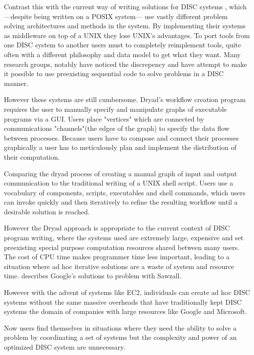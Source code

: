 \documentclass[11pt, letterpaper]{article}
\begin{document}
Contrast this with the current way of writing solutions for DISC systems , which ---despite being written on a POSIX system--- use vastly different problem solving architectures and methods in the system. By implementing their systems as middleware on top of a UNIX they lose UNIX's advantages.  To port tools from one DISC system to another users must to completely reimplement tools, quite often with a different philosophy and data model to get what they want. Many research groups, notably \cite{isard2007ddd} have noticed the discrepency and have attempt to make it possible to use preexisting sequential code to solve problems in a DISC manner.

However these systems are still cumbersome. Dryad's workflow creation program requires the user to manually specify and manipulate graphs of executable programs via a GUI. Users place "vertices" which are connected by communications "channels"(the edges of the graph) to specify the data flow between processes. Because users have to compose and connect their processes graphically a user has to meticulously plan and implement the distribution of their computation.

Comparing the dryad process of creating a manual graph of input and output communication to the traditional writing of a UNIX shell script. Users use a vocabulary of components, scripts, executables and shell commands, which users can invoke quickly and then iteratively to refine the resulting workflow until a desirable solution is reached.

However the Dryad approach is appropriate to the current context of DISC program writing, where the systems used are extremely large, expensive and set preexisting special purpose computation resources shared between many users. The cost of CPU time makes programmer time less important, leading to a situation where ad hoc iterative solutions are a waste of system and resource time. \cite{pike2005idp} describes Google's solutions to problem with Sawzall.

However with the advent of systems like EC2\cite{amazon:aec}, individuals can create ad hoc DISC systems without the same massive overheads that have traditionally kept DISC systems the domain of companies with large resources like Google and Microsoft.

Now users find themselves in situations where they need the ability to solve a problem by coordinating a set of systems but the complexity and power of an optimized DISC system are unnecessary. 
\end{document}
